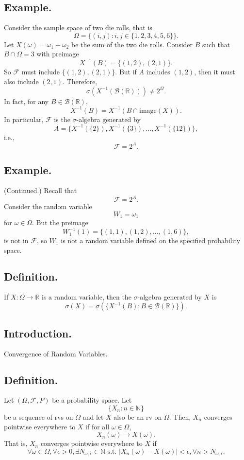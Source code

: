 \documentclass[titlepage]{article}
\begin{document}
\subsection{Example.} Consider the sample space of two die rolls, that is 
$$\Omega = \{(i, j): i, j \in \{1, 2, 3, 4, 5, 6\}\}.$$
Let $X(\omega) = \omega_{1} + \omega_{2}$ be the sum of the two die rolls. Consider $B$ such that $B \cap \Omega = 3$ with preimage 
$$X^{-1}(B) = \{(1, 2), (2, 1)\}.$$
So $\mathcal{F}$ must include $\{(1, 2), (2, 1)\}$. But if $A$ includes $(1, 2)$, then it must also include $(2, 1)$. Therefore, 
$$\sigma(X^{-1}(\mathcal{B}(\mathbb{R}))) \neq 2^{\Omega}.$$
In fact, for any $B \in \mathcal{B}(\mathbb{R})$,
$$X^{-1}(B) = X^{-1}(B \cap \text{image}(X)) .$$
In particular, $\mathcal{F}$ is the $\sigma$-algebra generated by 
$$A = \{X^{-1}(\{2\}), X^{-1}(\{3\}), \ldots, X^{-1}(\{12\})\},$$
i.e., 
$$\mathcal{F} = 2^{A}.$$

\subsection{Example.} (Continued.) Recall that 
$$\mathcal{F} = 2^{A}.$$
Consider the random variable $$W_{1} = \omega_{1}$$
for $\omega \in \Omega$. But the preimage 
$$W_{1}^{-1}(1) = \{(1, 1), (1, 2), \ldots, (1, 6)\},$$
is not in $\mathcal{F}$, so $W_{1}$ is not a random variable defined on the specified probability space.

\subsection{Definition.} If $X: \Omega \to \mathbb{R}$ is a random variable, then the $\sigma$-algebra generated by $X$ is 
$$\sigma(X) = \sigma\left(\{X^{-1}(B): B \in \mathcal{B}(\mathbb{R})\}\right).$$

\newpage {}

\subsection{Introduction.} Convergence of Random Variables.

\subsection{Definition.} Let $(\Omega, \mathcal{F}, P)$ be a probability space. Let 
$$\{X_{n}: n \in \mathbb{N}\}$$
be a sequence of rvs on $\Omega$ and let $X$ also be an rv on $\Omega$. Then, $X_{n}$ converges pointwise everywhere to $X$ if for all $\omega \in \Omega$,
$$X_{n}(\omega) \to X(\omega).$$
That is, $X_{n}$ converges pointwise everywhere to $X$ if 
$$\forall \omega \in \Omega, \forall \epsilon > 0, \exists N_{\omega,\epsilon} \in \mathbb{N} \text{ s.t. } |X_{n}(\omega) - X(\omega)| < \epsilon, \forall n > N_{\omega,\epsilon}.$$
\end{document}
